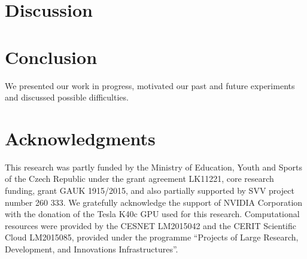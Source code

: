 \documentclass[11pt]{article}
\begin{document}
\section{Discussion}
\label{sec:discussion}


\section{Conclusion}
\label{sec:conclusion}
We presented our work in progress, motivated our past and future experiments and discussed possible difficulties.

\section*{Acknowledgments}
This research was partly funded by the Ministry of Education, Youth and Sports of the Czech Republic under the grant agreement LK11221, core research funding, grant GAUK 1915/2015, and also partially supported by SVV project number 260 333. 
We gratefully acknowledge the support of NVIDIA Corporation with the donation of the Tesla K40c GPU used for this research.
Computational resources were provided by the CESNET LM2015042 and the CERIT Scientific Cloud LM2015085, provided under the programme ``Projects of Large Research, Development, and Innovations Infrastructures''.



\end{document}
